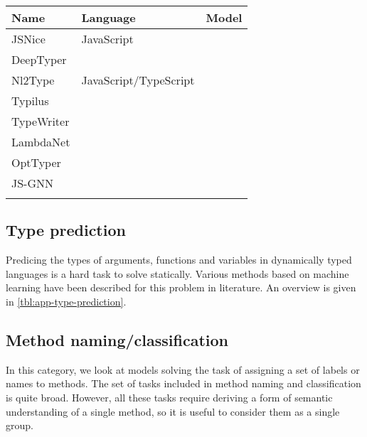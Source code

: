 \documentclass[sigconf,authordraft=true,nonacm=true]{acmart}
\begin{document}
\begin{table*}[t]
  \begin{tabularx}{\textwidth}{XXX}
    \toprule
    Name & Language & Model \\
    \midrule
    JSNice \cite{raychev_predicting_2019} & JavaScript & \\
    DeepTyper \cite{hellendoorn_deep_2018} & & \\
    Nl2Type \cite{malik_nl2type_2019} & JavaScript/TypeScript & \\
    Typilus \cite{allamanis_typilus_2020} & & \\
    TypeWriter \cite{pradel_typewriter_2020} & & \\
    LambdaNet \cite{wei_lambdanet_2020} & & \\
    OptTyper \cite{pandi_opttyper_2020} & & \\
    JS-GNN \cite{schrouff_inferring_2019} & & \\

    \\
    \bottomrule

  \end{tabularx}
  \caption{Implementations for type prediction}\label{tbl:app-type-prediction}
\end{table*}

\subsection{Type prediction}
Predicing the types of arguments, functions and variables in dynamically typed languages is a hard task to solve statically.
Various methods based on machine learning have been described for this problem in literature.
An overview is given in \cref{tbl:app-type-prediction}.


\subsection{Method naming/classification}
In this category, we look at models solving the task of assigning a set of labels or names to methods.
The set of tasks included in method naming and classification is quite broad.
However, all these tasks require deriving a form of semantic understanding of a single method, so it is useful to consider them as a single group.
\end{document}
